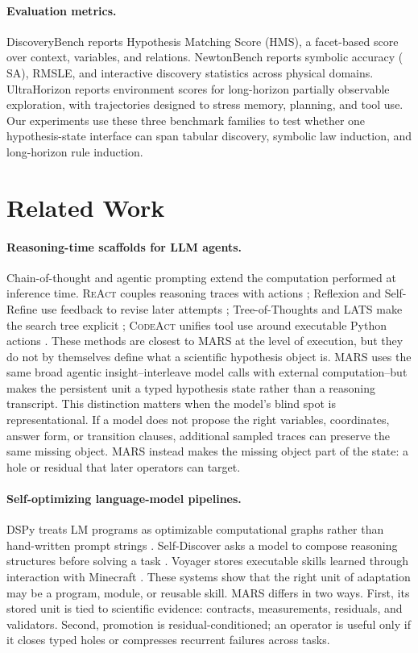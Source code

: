 \documentclass[letterpaper]{article}
\newcommand{\mars}{\textsc{MARS}\xspace}
\newcommand{\react}{\textsc{ReAct}\xspace}
\newcommand{\codeact}{\textsc{CodeAct}\xspace}
\newcommand{\hms}{\ensuremath{\mathrm{HMS}}\xspace}
\newcommand{\sa}{\ensuremath{\mathrm{SA}}\xspace}
\begin{document}
\paragraph{Evaluation metrics.}
DiscoveryBench reports Hypothesis Matching Score (\hms), a facet-based score
over context, variables, and relations. NewtonBench reports symbolic accuracy
(\sa), RMSLE, and interactive discovery statistics across physical domains.
UltraHorizon reports environment scores for long-horizon
partially observable exploration, with trajectories designed to stress memory,
planning, and tool use. Our experiments use these three benchmark families to
test whether one hypothesis-state interface can span tabular discovery,
symbolic law induction, and long-horizon rule induction.

\section{Related Work}

\paragraph{Reasoning-time scaffolds for LLM agents.}
Chain-of-thought and agentic prompting extend the computation performed at
inference time. \react couples reasoning traces with actions
\citep{react}; Reflexion and Self-Refine use feedback to revise later attempts
\citep{reflexion,selfrefine}; Tree-of-Thoughts and LATS make the search tree
explicit \citep{tot,lats}; \codeact unifies tool use around executable Python
actions \citep{codeact}. These methods are closest to \mars at the level of
execution, but they do not by themselves define what a scientific hypothesis
object is. \mars uses the same broad agentic insight--interleave model calls
with external computation--but makes the persistent unit a typed hypothesis
state rather than a reasoning transcript.
This distinction matters when the model's blind spot is representational. If a
model does not propose the right variables, coordinates, answer form, or
transition clauses, additional sampled traces can preserve the same missing
object. \mars instead makes the missing object part of the state: a hole or
residual that later operators can target.

\paragraph{Self-optimizing language-model pipelines.}
DSPy treats LM programs as optimizable computational graphs rather than
hand-written prompt strings \citep{dspy}. Self-Discover asks a model to compose
reasoning structures before solving a task \citep{selfdiscover}. Voyager stores
executable skills learned through interaction with Minecraft \citep{voyager}.
These systems show that the right unit of adaptation may be a program, module,
or reusable skill. \mars differs in two ways. First, its stored unit is tied to
scientific evidence: contracts, measurements, residuals, and validators.
Second, promotion is residual-conditioned; an operator is useful only if it
closes typed holes or compresses recurrent failures across tasks.
\end{document}
